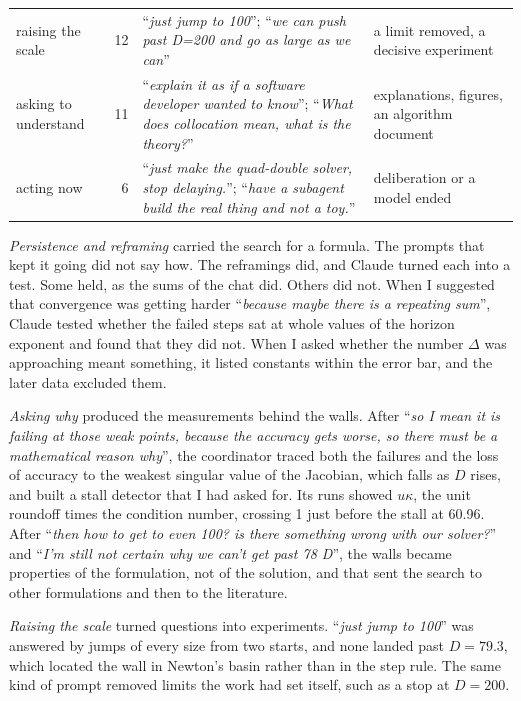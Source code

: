 \documentclass[aps,prd,onecolumn,superscriptaddress,nofootinbib,10pt]{revtex4-2}
\newcommand{\prompt}[1]{``\textit{#1}''}
\begin{document}
\begin{table}[t]
\begin{tabular}{L{2.9cm}rL{8.1cm}L{4.1cm}}
raising the scale & 12 & \prompt{just jump to 100}; \prompt{we can push past D=200 and go as large as we can} & a limit removed, a decisive experiment\\
asking to understand & 11 & \prompt{explain it as if a software developer wanted to know}; \prompt{What does collocation mean, what is the theory?} & explanations, figures, an algorithm document\\
acting now & 6 & \prompt{just make the quad-double solver, stop delaying.}; \prompt{have a subagent build the real thing and not a toy.} & deliberation or a model ended\\
\bottomrule
\end{tabular}
\end{table}

\emph{Persistence and reframing} carried the search for a formula. The prompts that kept it going did not say how. The
reframings did, and Claude turned each into a test. Some held, as the sums of the chat did. Others did not. When I
suggested that convergence was getting harder \prompt{because maybe there is a repeating sum}, Claude tested whether the
failed steps sat at whole values of the horizon exponent and found that they did not. When I asked whether the number
$\Delta$ was approaching meant something, it listed constants within the error bar, and the later data excluded them.

\emph{Asking why} produced the measurements behind the walls. After \prompt{so I mean it is failing at those weak points,
because the accuracy gets worse, so there must be a mathematical reason why}, the coordinator traced both the failures and
the loss of accuracy to the weakest singular value of the Jacobian, which falls as $D$ rises, and built a stall detector
that I had asked for. Its runs showed $u\kappa$, the unit roundoff times the condition number, crossing 1 just before the
stall at 60.96. After \prompt{then how
to get to even 100? is there something wrong with our solver?} and \prompt{I'm still not certain why we can't get past 78
D}, the walls became properties of the formulation, not of the solution, and that sent the search to other formulations
and then to the literature.

\emph{Raising the scale} turned questions into experiments. \prompt{just jump to 100} was answered by jumps of every size
from two starts, and none landed past $D = 79.3$, which located the wall in Newton's basin rather than in the step rule. The
same kind of prompt removed limits the work had set itself, such as a stop at $D = 200$.
\end{document}
